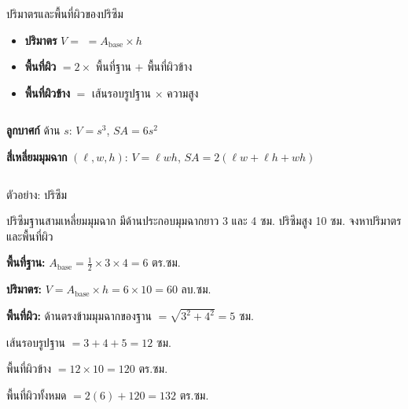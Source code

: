 \documentclass[11pt, aspectratio=169]{beamer}
\begin{document}
\begin{frame}{ปริมาตรและพื้นที่ผิวของปริซึม}
  \begin{explanation}[สูตร]
    \begin{itemize}
      \item \textbf{ปริมาตร} $V =$  $= A_{\text{base}} \times h$
      \item \textbf{พื้นที่ผิว} $= 2 \times$ พื้นที่ฐาน $+$ พื้นที่ผิวข้าง
      \item \textbf{พื้นที่ผิวข้าง} $=$ เส้นรอบรูปฐาน $\times$ ความสูง
    \end{itemize}
  \end{explanation}

  \begin{columns}[T]
      \centering
      \medskip\medskip\medskip\medskip

      \begin{exambox}
        \textbf{ลูกบาศก์} ด้าน $s$: $V = s^3$, $SA = 6s^2$

        \medskip
        \textbf{สี่เหลี่ยมมุมฉาก} $(\ell, w, h)$:
        $V = \ell w h$, $SA = 2(\ell w + \ell h + wh)$
      \end{exambox}
  \end{columns}
\end{frame}

\begin{frame}{ตัวอย่าง: ปริซึม}
  \begin{exambox}[โจทย์]
    ปริซึมฐานสามเหลี่ยมมุมฉาก มีด้านประกอบมุมฉากยาว 3 และ 4 ซม.
    ปริซึมสูง 10 ซม. จงหาปริมาตรและพื้นที่ผิว
  \end{exambox}

  \begin{solbox}[วิธีทำ]
    \textbf{พื้นที่ฐาน:} $A_{\text{base}} = \frac{1}{2} \times 3 \times 4 = 6$ ตร.ซม.

    \textbf{ปริมาตร:} $V = A_{\text{base}} \times h = 6 \times 10 = 60$ ลบ.ซม.

    \textbf{พื้นที่ผิว:} ด้านตรงข้ามมุมฉากของฐาน $= \sqrt{3^2 + 4^2} = 5$ ซม.
    \par เส้นรอบรูปฐาน $= 3 + 4 + 5 = 12$ ซม.
    \par พื้นที่ผิวข้าง $= 12 \times 10 = 120$ ตร.ซม.
    \par พื้นที่ผิวทั้งหมด $= 2(6) + 120 = 132$ ตร.ซม.
  \end{solbox}
\end{frame}
\end{document}
